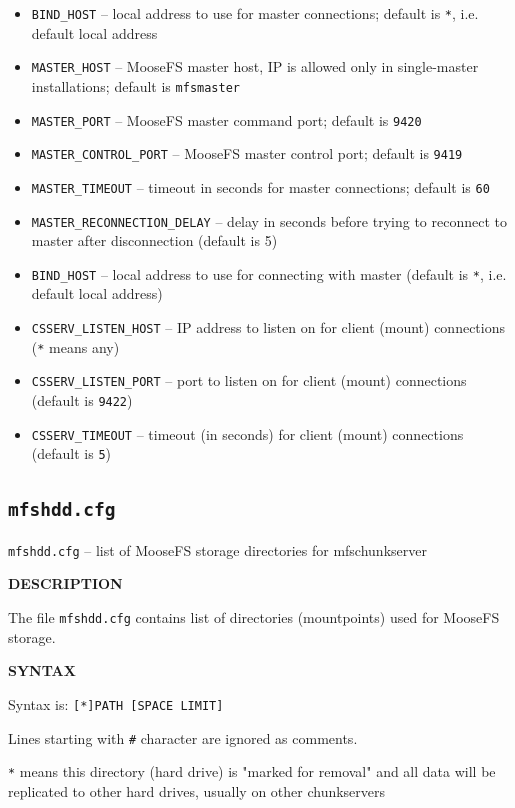 \documentclass[a4paper,11pt,english]{report}
\def\code#1{\texttt{#1}}
\begin{document}
\begin{itemize}
					\item \code{BIND\_HOST} -- local address to use for master connections; default is \code{*},  i.e. default local address
					\item \code{MASTER\_HOST} -- MooseFS master host, IP is allowed only in single-master installations; default is \code{mfsmaster}
					\item \code{MASTER\_PORT} -- MooseFS master command port; default is \code{9420}
					\item \code{MASTER\_CONTROL\_PORT} -- MooseFS master control port; default is \code{9419}
					\item \code{MASTER\_TIMEOUT} -- timeout in seconds for master connections; default is \code{60}
					\item \code{MASTER\_RECONNECTION\_DELAY} -- delay in seconds before trying to reconnect to master after disconnection (default is 5)
					\item \code{BIND\_HOST} -- local  address  to use for connecting with master (default is \code{*}, i.e. default local address)
					\item \code{CSSERV\_LISTEN\_HOST} -- IP address to listen on for client (mount) connections (\code{*}  means any)
					\item \code{CSSERV\_LISTEN\_PORT} -- port  to  listen  on  for client (mount) connections (default is \code{9422})
					\item \code{CSSERV\_TIMEOUT} -- timeout (in seconds) for client (mount) connections (default  is \code{5})
				\end{itemize}
			
			\subsection{\code{mfshdd.cfg}}
				\code{mfshdd.cfg} -- list of MooseFS storage directories for mfschunkserver

				\bigskip
				\textbf{DESCRIPTION}
				
				The file \code{mfshdd.cfg} contains list of directories (mountpoints) used for MooseFS storage.
		
				\bigskip
				\textbf{SYNTAX}
				
				Syntax is:
				\code{[*]PATH [SPACE LIMIT]}

				Lines starting with \code{\#} character are ignored as comments.
				
				\code{*} means this directory (hard drive) is "marked for removal" and all data will be replicated to other hard drives, usually on other chunkservers
\end{document}
